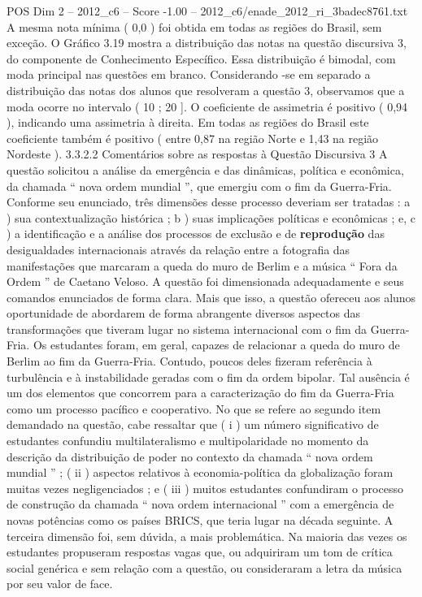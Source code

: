 \begin{textsample}{POS Dim 2 – 2012\_c6 – Score -1.00 – 2012\_c6/enade\_2012\_ri\_3badec8761.txt}
A mesma nota mínima ( 0,0 ) foi obtida em todas as regiões do Brasil, sem exceção.
O Gráfico 3.19 mostra a distribuição das notas na questão discursiva 3, do componente de Conhecimento Específico.
Essa distribuição é bimodal, com moda principal nas questões em branco.
Considerando -se em separado a distribuição das notas dos alunos que resolveram a questão 3, observamos que a moda ocorre no intervalo ( 10 ; 20 ].
O coeficiente de assimetria é positivo ( 0,94 ), indicando uma assimetria à direita.
Em todas as regiões do Brasil este coeficiente também é positivo ( entre 0,87 na região Norte e 1,43 na região Nordeste ). 3.3.2.2 Comentários sobre as respostas à Questão Discursiva 3 A questão solicitou a análise da emergência e das dinâmicas, política e econômica, da chamada “ nova ordem mundial ”, que emergiu com o fim da Guerra-Fria.
Conforme seu enunciado, três dimensões desse processo deveriam ser tratadas : a ) sua contextualização histórica ; b ) suas implicações políticas e econômicas ; e, c ) a identificação e a análise dos processos de exclusão e de \textbf{reprodução} das desigualdades internacionais através da relação entre a fotografia das manifestações que marcaram a queda do muro de Berlim e a música “ Fora da Ordem ” de Caetano Veloso.
A questão foi dimensionada adequadamente e seus comandos enunciados de forma clara.
Mais que isso, a questão ofereceu aos alunos oportunidade de abordarem de forma abrangente diversos aspectos das transformações que tiveram lugar no sistema internacional com o fim da Guerra-Fria.
Os estudantes foram, em geral, capazes de relacionar a queda do muro de Berlim ao fim da Guerra-Fria.
Contudo, poucos deles fizeram referência à turbulência e à instabilidade geradas com o fim da ordem bipolar.
Tal ausência é um dos elementos que concorrem para a caracterização do fim da Guerra-Fria como um processo pacífico e cooperativo.
No que se refere ao segundo item demandado na questão, cabe ressaltar que ( i ) um número significativo de estudantes confundiu multilateralismo e multipolaridade no momento da descrição da distribuição de poder no contexto da chamada “ nova ordem mundial ” ; ( ii ) aspectos relativos à economia-política da globalização foram muitas vezes negligenciados ; e ( iii ) muitos estudantes confundiram o processo de construção da chamada “ nova ordem internacional ” com a emergência de novas potências como os países BRICS, que teria lugar na década seguinte.
A terceira dimensão foi, sem dúvida, a mais problemática.
Na maioria das vezes os estudantes propuseram respostas vagas que, ou adquiriram um tom de crítica social genérica e sem relação com a questão, ou consideraram a letra da música por seu valor de face.

\end{textsample}
